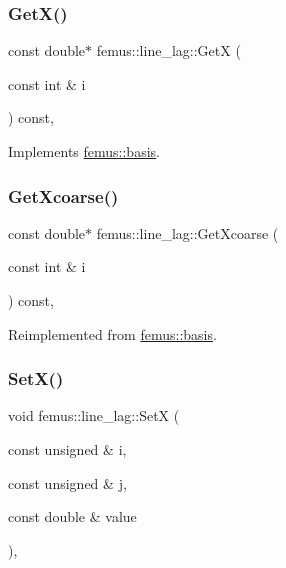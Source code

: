 \subsubsection{\texorpdfstring{Get\+X()}{GetX()}}
{\footnotesize\ttfamily const double$\ast$ femus\+::line\+\_\+lag\+::\+GetX (\begin{DoxyParamCaption}\item[{const int \&}]{i }\end{DoxyParamCaption}) const\hspace{0.3cm}{\ttfamily [inline]}, {\ttfamily [virtual]}}



Implements \mbox{\hyperlink{classfemus_1_1basis_a00597122bbc75877f1c184f8fce4986c}{femus\+::basis}}.

\mbox{\label{classfemus_1_1line__lag_aea0db4bd5a70c069b7cbf3f2f92a0c79}} 
\subsubsection{\texorpdfstring{Get\+Xcoarse()}{GetXcoarse()}}
{\footnotesize\ttfamily const double$\ast$ femus\+::line\+\_\+lag\+::\+Get\+Xcoarse (\begin{DoxyParamCaption}\item[{const int \&}]{i }\end{DoxyParamCaption}) const\hspace{0.3cm}{\ttfamily [inline]}, {\ttfamily [virtual]}}



Reimplemented from \mbox{\hyperlink{classfemus_1_1basis_afcabbbda61ede8f30158fe08ee0a5258}{femus\+::basis}}.

\mbox{\label{classfemus_1_1line__lag_a7b6b910b65c797ed3659b38044c3d1d7}} 
\subsubsection{\texorpdfstring{Set\+X()}{SetX()}}
{\footnotesize\ttfamily void femus\+::line\+\_\+lag\+::\+SetX (\begin{DoxyParamCaption}\item[{const unsigned \&}]{i,  }\item[{const unsigned \&}]{j,  }\item[{const double \&}]{value }\end{DoxyParamCaption})\hspace{0.3cm}{\ttfamily [inline]}, {\ttfamily [virtual]}}



